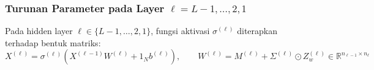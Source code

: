 \documentclass[11pt,a4paper]{article}
\def\mathbf#1{#1}%
\theoremstyle{plain}
\theoremstyle{definition}
\theoremstyle{remark}
\begin{document}
\clearpage
\subsubsection{Turunan Parameter pada Layer \texorpdfstring{$\ell = L-1, \dots, 2, 1$}{l = L-1, ..., 2, 1}}
\label{subsubsec:gradien_layer_hidden_reparam}

\noindent Pada hidden layer $\ell \in \{L-1, \dots, 2, 1\}$, fungsi aktivasi $\sigma^{(\ell)}$ diterapkan terhadap bentuk matriks:
\begin{equation}
    X^{(\ell)} = \sigma^{(\ell)}\!\left( X^{(\ell-1)} W^{(\ell)} + \mathbf{1}_N \mathbf{b}^{(\ell)} \right), \qquad W^{(\ell)} = M^{(\ell)} + \Sigma^{(\ell)} \odot Z_w^{(\ell)} \in \mathbb{R}^{n_{\ell-1} \times n_\ell}
\end{equation}
\end{document}
